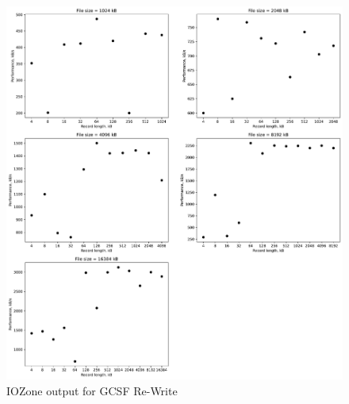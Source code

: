 \begin{figure}[!htb]
	\label{fig:app_benchgcsfs_re_write}
	\begin{center}
		\includegraphics[width=1.0\textwidth]{figures/benchmarking/gcsf/Re-Write.pdf}
	\end{center}
	\caption{IOZone output for \gls{GCSF} Re-Write}
\end{figure}

